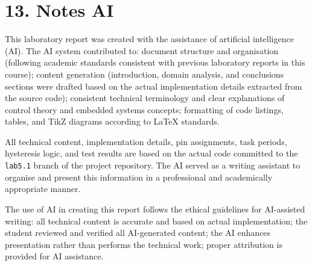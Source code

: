 \documentclass[12pt]{article}
\begin{document}
\section*{13. Notes AI}

This laboratory report was created with the assistance of artificial intelligence
(AI). The AI system contributed to: document structure and organisation (following
academic standards consistent with previous laboratory reports in this course);
content generation (introduction, domain analysis, and conclusions sections were
drafted based on the actual implementation details extracted from the source code);
consistent technical terminology and clear explanations of control theory and
embedded systems concepts; formatting of code listings, tables, and TikZ diagrams
according to LaTeX standards.

All technical content, implementation details, pin assignments, task periods,
hysteresis logic, and test results are based on the actual code committed to the
\texttt{lab5.1} branch of the project repository. The AI served as a writing
assistant to organise and present this information in a professional and academically
appropriate manner.

The use of AI in creating this report follows the ethical guidelines for
AI-assisted writing: all technical content is accurate and based on actual
implementation; the student reviewed and verified all AI-generated content; the AI
enhances presentation rather than performs the technical work; proper attribution is
provided for AI assistance.
\end{document}
